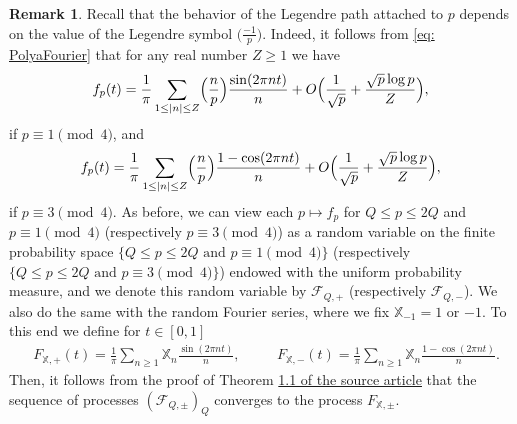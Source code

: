 \documentclass[10pt]{amsart}
\theoremstyle{plain}
\theoremstyle{definition}
\newtheorem{rem}[thm]{Remark}
\newcommand{\Legendre}[2]{\Bigl(\dfrac{#1}{#2}\Bigr)}
\newcommand{\legendre}[2]{\bigl(\tfrac{#1}{#2}\bigr)}
\newcommand{\X}{\mathbb{X}}
\begin{document}
\begin{rem} Recall that the behavior of the Legendre path attached to $p$ depends on the value of the Legendre symbol $\legendre{-1}{p}$. Indeed, it follows from \eqref{eq: PolyaFourier} that for any real number $Z\geq 1$ we have
\begin{equation} \label{eq: Polya1mod4}f_p(t) = \frac{1}{\pi } \sum_{1 \leq |n| \leq Z} \Legendre{n}{p} \frac{\sin(2\pi n t)}{n} + O\Bigl(\frac{1}{\sqrt{p}}+\frac{\sqrt{p}\log p}{Z}\Bigr),
\end{equation}
if $p\equiv 1 \pmod 4$, and
\begin{equation} \label{eq: Polya3mod4}f_p(t) = \frac{1}{\pi } \sum_{1 \leq |n| \leq Z} \Legendre{n}{p} \frac{1-\cos(2\pi n t)}{n} + O\Bigl(\frac{1}{\sqrt{p}}+\frac{\sqrt{p}\log p}{Z}\Bigr),
\end{equation}
if $p\equiv 3\pmod 4$. As before, we can view each $p \mapsto f_p$ for $Q\leq p\leq 2Q$ and $p\equiv 1\pmod 4$ (respectively $p\equiv 3\pmod 4$) as a random variable on the finite probability space $\{Q\leq p\leq 2Q \text{ and } p\equiv 1\pmod 4\}$ (respectively $\{Q\leq p\leq 2Q \text{ and } p\equiv 3\pmod 4\}$) endowed with the uniform probability measure, and we denote this random variable by $\mathcal{F}_{Q, +}$ (respectively $\mathcal{F}_{Q, -}$). We also
do the same with the random Fourier series, where we fix $\X_{-1} = 1$ or $-1$. To this end we define for $t\in [0, 1]$
\begin{align*}
&F_{\X,+}(t) = \frac{1}{\pi} \sum_{n \geq 1} \X_n \frac{\sin(2\pi nt)}{n}, &\quad &F_{\X,-}(t) = \frac{1}{\pi} \sum_{n \geq 1} \X_n \frac{1 - \cos(2 \pi n t)}{n}.
\end{align*}
Then, it follows from the proof of Theorem \href{https://doi.org/10.5802/jep.260}{1.1 of the source article} that the sequence of processes $(\mathcal{F}_{Q, \pm})_{Q}$ converges to the process $F_{\X, \pm}$.
\end{rem}
\end{document}
